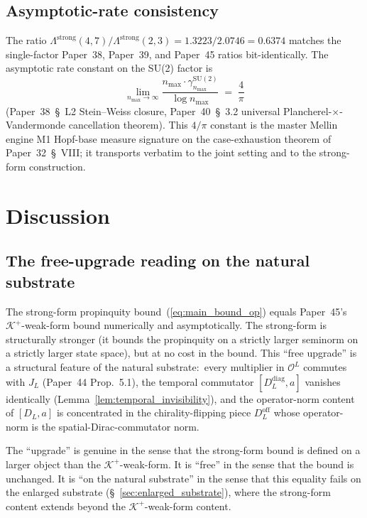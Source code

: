 \documentclass[11pt,a4paper]{article}
\theoremstyle{plain}
\theoremstyle{definition}
\newcommand{\nmax}{n_{\max}}
\newcommand{\Krein}{\mathcal{K}}
\newcommand{\Op}{\mathcal{O}}
\newcommand{\SU}{\mathrm{SU}}
\newcommand{\DL}{D_{L}}
\newcommand{\Ddiag}{D_{L}^{\mathrm{diag}}}
\newcommand{\Doff}{D_{L}^{\mathrm{off}}}
\newcommand{\JL}{J_{L}}
\newcommand{\Lprop}{\Lambda^{\mathrm{strong}}}
\newcommand{\gammaSU}{\gamma^{\SU(2)}}
\newcommand{\Kplus}{\Krein^{+}}
\begin{document}
\subsection{Asymptotic-rate consistency}\label{sec:asymp_consistency_op}

The ratio $\Lprop(4, 7) / \Lprop(2, 3) = 1.3223 / 2.0746 = 0.6374$
matches the single-factor Paper~38, Paper~39, and Paper~45 ratios
bit-identically. The asymptotic rate constant on the SU(2) factor is
\begin{equation*}
   \lim_{\nmax \to \infty} \frac{\nmax \cdot \gammaSU_{\nmax}}{\log\nmax}
   \;=\; \frac{4}{\pi}
\end{equation*}
(Paper~38~\S~L2 Stein--Weiss closure, Paper~40~\S~3.2 universal
Plancherel-$\times$-Vandermonde cancellation theorem). This $4/\pi$
constant is the master Mellin engine M1 Hopf-base measure signature on
the case-exhaustion theorem of Paper~32~\S~VIII; it transports
verbatim to the joint setting and to the strong-form construction.

\section{Discussion}\label{sec:discussion}

\subsection{The free-upgrade reading on the natural substrate}
\label{sec:free_upgrade_substrate}

The strong-form propinquity bound~(\ref{eq:main_bound_op}) equals
Paper~45's $\Kplus$-weak-form bound numerically and asymptotically.
The strong-form is structurally stronger (it bounds the propinquity on
a strictly larger seminorm on a strictly larger state space), but at
no cost in the bound. This ``free upgrade'' is a structural feature of
the natural substrate:\ every multiplier in $\Op^{L}$ commutes with
$\JL$ (Paper~44 Prop.~5.1), the temporal commutator
$[\Ddiag, a]$ vanishes identically
(Lemma~\ref{lem:temporal_invisibility}), and the operator-norm content
of $[\DL, a]$ is concentrated in the chirality-flipping piece
$\Doff$ whose operator-norm is the spatial-Dirac-commutator norm.

The ``upgrade'' is genuine in the sense that the strong-form bound is
defined on a larger object than the $\Kplus$-weak-form. It is ``free''
in the sense that the bound is unchanged. It is ``on the natural
substrate'' in the sense that this equality fails on the enlarged
substrate (\S~\ref{sec:enlarged_substrate}), where the strong-form
content extends beyond the $\Kplus$-weak-form content.
\end{document}
